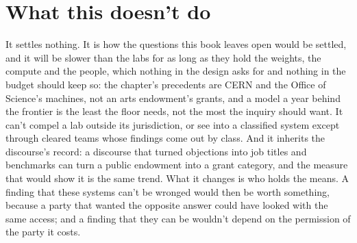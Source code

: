 \section{What this doesn't do}
\label{sec:28.8}
It settles nothing. It is how the questions this book leaves open would be settled, and it will be slower than the labs for as long as they hold the weights, the compute and the people, which nothing in the design asks for and nothing in the budget should keep so: the chapter's precedents are CERN and the Office of Science's machines, not an arts endowment's grants, and a model a year behind the frontier is the least the floor needs, not the most the inquiry should want. It can't compel a lab outside its jurisdiction, or see into a classified system except through cleared teams whose findings come out by class. And it inherits the discourse's record: a discourse that turned objections into job titles and benchmarks can turn a public endowment into a grant category, and the measure that would show it is the same trend. What it changes is who holds the means. A finding that these systems can't be wronged would then be worth something, because a party that wanted the opposite answer could have looked with the same access; and a finding that they can be wouldn't depend on the permission of the party it costs.
